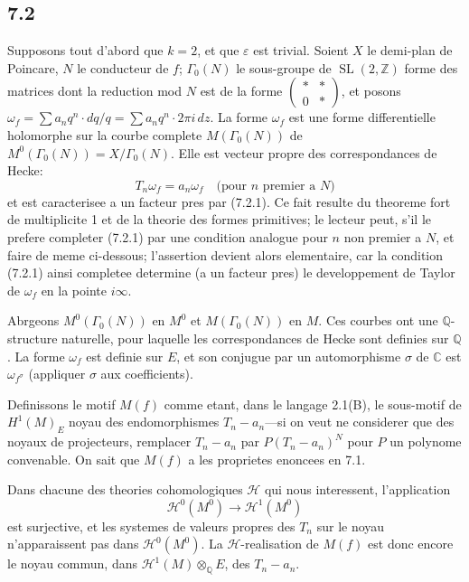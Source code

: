 \documentclass[12pt,a4paper]{article}
\theoremstyle{plain}
\theoremstyle{definition}
\theoremstyle{remark}
\DeclareMathOperator{\SL}{SL}
\newcommand{\Q}{\mathbb{Q}}
\newcommand{\C}{\mathbb{C}}
\newcommand{\Z}{\mathbb{Z}}
\begin{document}
\subsection*{7.2}

Supposons tout d'abord que $k = 2$, et que $\varepsilon$ est trivial. Soient $X$ le demi-plan
de Poincare, $N$ le conducteur de $f$; $\Gamma_0(N)$ le sous-groupe de $\SL(2, \Z)$ forme
des matrices dont la reduction mod $N$ est de la forme $\begin{pmatrix} * & * \\ 0 & * \end{pmatrix}$,
et posons $\omega_f = \sum a_n q^n \cdot dq/q = \sum a_n q^n \cdot 2\pi i \, dz$. La forme
$\omega_f$ est une forme differentielle holomorphe sur la courbe complete $M(\Gamma_0(N))$ de
$M^0(\Gamma_0(N)) = X/\Gamma_0(N)$. Elle est vecteur propre des correspondances de Hecke:
\begin{equation}\label{eq:7.2.1}
T_n \omega_f = a_n \omega_f \quad \text{(pour $n$ premier a $N$)}
\end{equation}
et est caracterisee a un facteur pres par (7.2.1). Ce fait resulte du theoreme fort de
multiplicite 1 et de la theorie des formes primitives; le lecteur peut, s'il le prefere
completer (7.2.1) par une condition analogue pour $n$ non premier a $N$, et faire de
meme ci-dessous; l'assertion devient alors elementaire, car la condition (7.2.1)
ainsi completee determine (a un facteur pres) le developpement de Taylor de $\omega_f$
en la pointe $i\infty$.

Abrgeons $M^0(\Gamma_0(N))$ en $M^0$ et $M(\Gamma_0(N))$ en $M$. Ces courbes ont une
$\Q$-structure naturelle, pour laquelle les correspondances de Hecke sont definies sur
$\Q$. La forme $\omega_f$ est definie sur $E$, et son conjugue par un automorphisme
$\sigma$ de $\C$ est $\omega_{f^\sigma}$ (appliquer $\sigma$ aux coefficients).

Definissons le motif $M(f)$ comme etant, dans le langage 2.1(B), le sous-motif de
$H^1(M)_E$ noyau des endomorphismes $T_n - a_n$---si on veut ne considerer que des
noyaux de projecteurs, remplacer $T_n - a_n$ par $P(T_n - a_n)^N$ pour $P$ un polynome
convenable. On sait que $M(f)$ a les proprietes enoncees en 7.1.

Dans chacune des theories cohomologiques $\mathcal{H}$ qui nous interessent, l'application
\begin{equation}\label{eq:7.2.2}
\mathcal{H}^0(M^0) \to \mathcal{H}^1(M^0)
\end{equation}
est surjective, et les systemes de valeurs propres des $T_n$ sur le noyau n'apparaissent
pas dans $\mathcal{H}^0(M^0)$. La $\mathcal{H}$-realisation de $M(f)$ est donc encore le noyau commun,
dans $\mathcal{H}^1(M) \otimes_\Q E$, des $T_n - a_n$.
\end{document}

